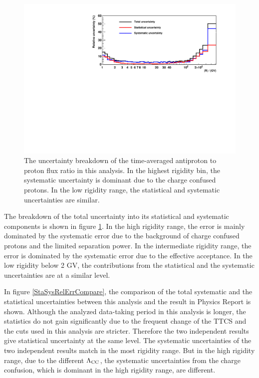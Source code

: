 \begin{figure}[hptb]
\centering
\includegraphics[width=1.0\textwidth, height=0.33\textheight]{Figures/chapter5/timeaveraged/TotalRelErr_BreakDown_pass78.pdf}
\caption[Uncertainty breakdown of the time-averaged antiproton to proton flux ratio.]{The uncertainty breakdown of the time-averaged antiproton to proton flux ratio in this analysis. In the highest rigidity bin, the systematic uncertainty is dominant due to the charge confused protons. In the low rigidity range, the statistical and systematic uncertainties are similar.}
\label{totalerrorbreakdown}
\end{figure}

The breakdown of the total uncertainty into its statistical and systematic components is shown in figure \ref{totalerrorbreakdown}. In the high rigidity range, the error is mainly dominated by the systematic error due to the background of charge confused protons and the limited separation power. In the intermediate rigidity range, the error is dominated by the systematic error due to the effective acceptance. In the low rigidity below 2 GV, the contributions from the statistical and the systematic uncertainties are at a similar level. \par

In figure \ref{StaSysRelErrCompare}, the comparison of the total systematic and the statistical uncertainties between this analysis and the result in Physics Report \cite{PhysicsReport2} is shown. Although the analyzed data-taking period in this analysis is longer, the statistics do not gain significantly due to the frequent change of the TTCS and the cuts used in this analysis are stricter. Therefore the two independent results give statistical uncertainty at the same level. The systematic uncertainties of the two independent results match in the most rigidity range. But in the high rigidity range, due to the different $\Lambda_{\rm{CC}}$, the systematic uncertainties from the charge confusion, which is dominant in the high rigidity range, are different. \par


